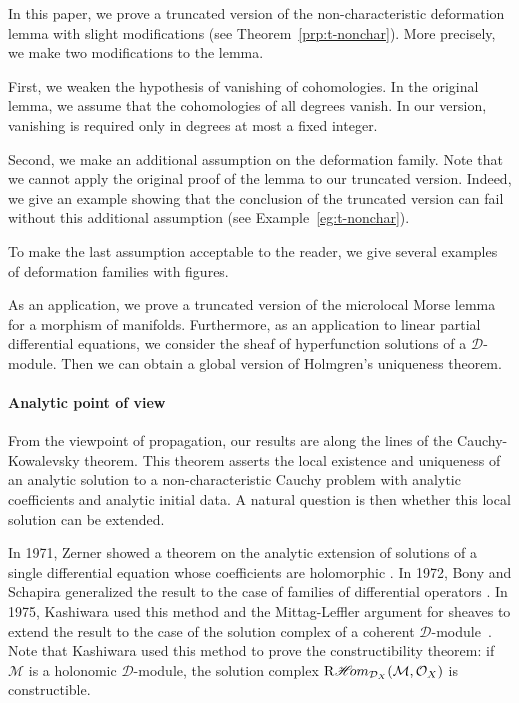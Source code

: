 In this paper, we prove a truncated version 
of the non-characteristic deformation lemma
with slight modifications (see Theorem~\ref{prp:t-nonchar}). 
More precisely, 
we make two modifications 
to the lemma. 

First, we weaken the hypothesis of vanishing of 
cohomologies. In the original lemma, we assume that 
the cohomologies of all degrees vanish. 
In our version, 
vanishing is required only in degrees at most a fixed integer.

Second, we make an additional assumption on 
the deformation family.
Note that 
we cannot apply the original proof of the lemma
to our truncated version. 
Indeed, we give an example 
showing that 
the conclusion of the truncated version can fail
without this additional assumption (see Example~\ref{eg:t-nonchar}).

To make the last
assumption acceptable to the reader, 
we give several examples of deformation families
with figures. 


As an application, 
we prove a truncated version of 
the microlocal Morse lemma for a morphism of manifolds.
Furthermore, as an application to 
linear partial differential equations, 
we consider the sheaf of hyperfunction 
solutions of a \(\mathcal{D}\)-module. 
Then we can obtain a global version of 
Holmgren's uniqueness theorem. 

\paragraph{Analytic point of view} 

From the viewpoint of propagation, 
our results are along the lines of 
the Cauchy-Kowalevsky theorem. 
This theorem asserts the local existence and uniqueness 
of an analytic solution to 
a non-characteristic Cauchy problem 
with analytic coefficients and analytic initial data. 
A natural question is then 
whether this local solution can be extended.

In 1971, Zerner showed a theorem on the analytic extension of 
solutions of a single differential equation 
whose coefficients are holomorphic \cite{Zer71}. 
In 1972, Bony and Schapira generalized the result to 
the case of families of differential operators \cite{BS72}. 
In 1975, Kashiwara used this method and 
the Mittag-Leffler argument for sheaves to extend the result 
to the case of the solution complex of 
a coherent \(\mathcal{D}\)-module~\cite{Kas75}. 
Note that Kashiwara used this method to prove 
the constructibility theorem:  
if \(\mathcal{M}\) is a holonomic \(\mathcal{D}\)-module,
the solution complex \(
    \mathop{\mathrm{R}\hspace{-1.5pt}\mathop{\mathscr{H}\hspace{-2pt}om}\nolimits}\nolimits_{\mathcal{D}_{X}}(\mathcal{M},\mathcal{O}_{X})
\) is constructible.

